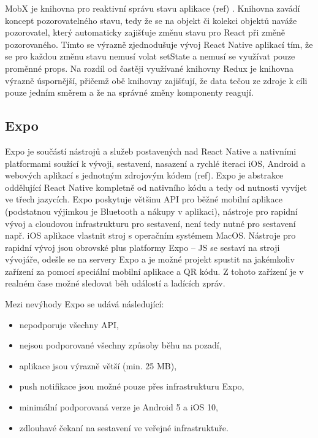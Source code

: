 
MobX je knihovna pro reaktivní správu stavu aplikace (ref)
. Knihovna zavádí koncept pozorovatelného stavu, tedy že se na objekt či kolekci objektů naváže pozorovatel, který automaticky zajišťuje změnu stavu pro React při změně pozorovaného. Tímto se výrazně zjednodušuje vývoj React Native aplikací tím, že se pro každou změnu stavu nemusí volat setState a nemusí se využívat pouze proměnné props. Na rozdíl od častěji využívané knihovny Redux je knihovna výrazně úspornější, přičemž obě knihovny zajišťují, že data tečou ze zdroje k cíli pouze jedním směrem a že na správné změny komponenty reagují.

\subsection{Expo}


Expo je součástí nástrojů a služeb postavených nad React Native a nativními platformami soužící k vývoji, sestavení, nasazení a rychlé iteraci iOS, Android a webových aplikací s jednotným zdrojovým kódem (ref). Expo je abstrakce oddělující React Native kompletně od nativního kódu a tedy od nutnosti vyvíjet ve třech jazycích. Expo poskytuje většinu API pro běžné mobilní aplikace (podstatnou výjimkou je Bluetooth a nákupy v aplikaci), nástroje pro rapidní vývoj a cloudovou infrastrukturu pro sestavení, není tedy nutné pro sestavení např. iOS aplikace vlastnit stroj s operačním systémem MacOS. Nástroje pro rapidní vývoj jsou obrovské plus platformy Expo -- JS se sestaví na stroji vývojáře, odešle se na servery Expo a je možné projekt spustit na jakémkoliv zařízení za pomocí speciální mobilní aplikace a QR kódu. Z tohoto zařízení je v realném čase možné sledovat běh událostí a ladících zpráv. 

Mezi nevýhody Expo se udává následující:

\begin{itemize}
	\item nepodporuje všechny API,
	\item nejsou podporované všechny způsoby běhu na pozadí,
	\item aplikace jsou výrazně větší (min. 25 MB),
	\item push notifikace jsou možné pouze přes infrastrukturu Expo,
	\item minimální podporovaná verze je Android 5 a iOS 10,
	\item zdlouhavé čekaní na sestavení ve veřejné infrastruktuře.
\end{itemize}

